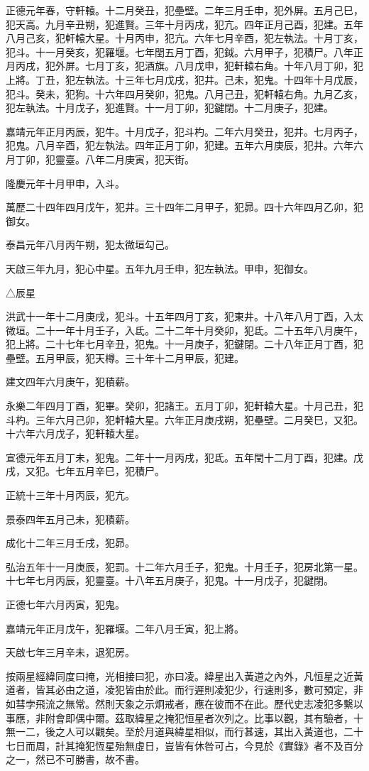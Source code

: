 \begin{pinyinscope}
正德元年春，守軒轅。十二月癸丑，犯壘壁。二年三月壬申，犯外屏。五月己巳，犯天高。九月辛丑朔，犯進賢。三年十月丙戌，犯亢。四年正月己酉，犯建。五年八月己亥，犯軒轅大星。十月丙申，犯亢。六年七月辛酉，犯左執法。十月丁亥，犯斗。十一月癸亥，犯羅堰。七年閏五月丁酉，犯鉞。六月甲子，犯積尸。八年正月丙戌，犯外屏。七月丁亥，犯酒旗。八月戊申，犯軒轅右角。十年八月丁卯，犯上將。丁丑，犯左執法。十三年七月戊戌，犯井。己未，犯鬼。十四年十月戊辰，犯斗。癸未，犯狗。十六年四月癸卯，犯鬼。八月己丑，犯軒轅右角。九月乙亥，犯左執法。十月戊子，犯進賢。十一月丁卯，犯鍵閉。十二月庚子，犯建。

嘉靖元年正月丙辰，犯牛。十月戊子，犯斗杓。二年六月癸丑，犯井。七月丙子，犯鬼。八月辛酉，犯左執法。四年正月丁卯，犯建。五年六月庚辰，犯井。六年六月丁卯，犯靈臺。八年二月庚寅，犯天街。

隆慶元年十月甲申，入斗。

萬歷二十四年四月戊午，犯井。三十四年二月甲子，犯昴。四十六年四月乙卯，犯御女。

泰昌元年八月丙午朔，犯太微垣勾己。

天啟三年九月，犯心中星。五年九月壬申，犯左執法。甲申，犯御女。

△辰星

洪武十一年十二月庚戌，犯斗。十五年四月丁亥，犯東井。十八年八月丁酉，入太微垣。二十一年十月壬子，入氐。二十二年十月癸卯，犯氐。二十五年八月庚午，犯上將。二十七年七月辛丑，犯鬼。十一月庚子，犯鍵閉。二十八年正月丁酉，犯壘壁。五月甲辰，犯天樽。三十年十二月甲辰，犯建。

建文四年六月庚午，犯積薪。

永樂二年四月丁酉，犯畢。癸卯，犯諸王。五月丁卯，犯軒轅大星。十月己丑，犯斗杓。三年六月己卯，犯軒轅大星。六年正月庚戌朔，犯壘壁。二月癸巳，又犯。十六年六月戊子，犯軒轅大星。

宣德元年五月丁未，犯鬼。二年十一月丙戌，犯氐。五年閏十二月丁酉，犯建。戊戌，又犯。七年五月辛巳，犯積尸。

正統十三年十月丙辰，犯亢。

景泰四年五月己未，犯積薪。

成化十二年三月壬戌，犯昴。

弘治五年十一月庚辰，犯罰。十二年六月壬子，犯鬼。十月壬子，犯房北第一星。十七年七月丙辰，犯靈臺。十八年五月庚子，犯鬼。十一月戊子，犯鍵閉。

正德七年六月丙寅，犯鬼。

嘉靖元年正月戊午，犯羅堰。二年八月壬寅，犯上將。

天啟七年三月辛未，退犯房。

按兩星經緯同度曰掩，光相接曰犯，亦曰凌。緯星出入黃道之內外，凡恒星之近黃道者，皆其必由之道，凌犯皆由於此。而行遲則凌犯少，行速則多，數可預定，非如彗孛飛流之無常。然則天象之示炯戒者，應在彼而不在此。歷代史志凌犯多繫以事應，非附會即偶中爾。茲取緯星之掩犯恒星者次列之。比事以觀，其有驗者，十無一二，後之人可以觀矣。至於月道與緯星相似，而行甚速，其出入黃道也，二十七日而周，計其掩犯恆星殆無虛日，豈皆有休咎可占，今見於《實錄》者不及百分之一，然已不可勝書，故不書。


\end{pinyinscope}
